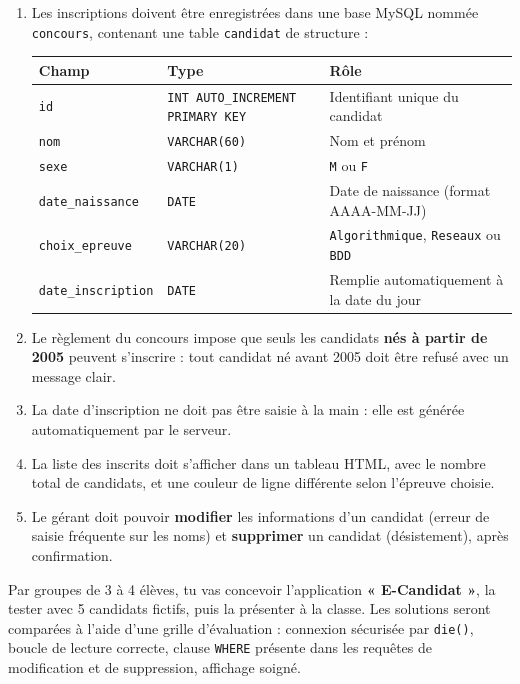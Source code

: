 \documentclass[11pt]{article}
\begin{document}
\begin{enumerate}
\item Les inscriptions doivent être enregistrées dans une base MySQL nommée \texttt{concours}, contenant une table \texttt{candidat} de structure :
\begin{center}
\begin{tabularx}{\linewidth}{|l|l|X|}
\hline
\rowcolor{popblueL} \textbf{Champ} & \textbf{Type} & \textbf{Rôle} \\
\hline
\texttt{id} & \texttt{INT AUTO\_INCREMENT PRIMARY KEY} & Identifiant unique du candidat \\
\hline
\texttt{nom} & \texttt{VARCHAR(60)} & Nom et prénom \\
\hline
\texttt{sexe} & \texttt{VARCHAR(1)} & \texttt{M} ou \texttt{F} \\
\hline
\texttt{date\_naissance} & \texttt{DATE} & Date de naissance (format AAAA-MM-JJ) \\
\hline
\texttt{choix\_epreuve} & \texttt{VARCHAR(20)} & \texttt{Algorithmique}, \texttt{Reseaux} ou \texttt{BDD} \\
\hline
\texttt{date\_inscription} & \texttt{DATE} & Remplie automatiquement à la date du jour \\
\hline
\end{tabularx}
\end{center}
\item Le règlement du concours impose que seuls les candidats \textbf{nés à partir de 2005} peuvent s'inscrire : tout candidat né avant 2005 doit être refusé avec un message clair.
\item La date d'inscription ne doit pas être saisie à la main : elle est générée automatiquement par le serveur.
\item La liste des inscrits doit s'afficher dans un tableau HTML, avec le nombre total de candidats, et une couleur de ligne différente selon l'épreuve choisie.
\item Le gérant doit pouvoir \textbf{modifier} les informations d'un candidat (erreur de saisie fréquente sur les noms) et \textbf{supprimer} un candidat (désistement), après confirmation.
\end{enumerate}

Par groupes de 3 à 4 élèves, tu vas concevoir l'application \textbf{« E-Candidat »}, la tester avec 5 candidats fictifs, puis la présenter à la classe. Les solutions seront comparées à l'aide d'une grille d'évaluation : connexion sécurisée par \texttt{die()}, boucle de lecture correcte, clause \texttt{WHERE} présente dans les requêtes de modification et de suppression, affichage soigné.
\end{document}
